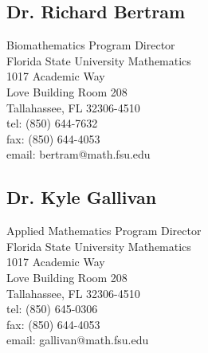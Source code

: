 \documentclass[11pt]{cv}
\begin{document}
\subsection*{Dr. Richard Bertram}
\label{sec:orgff525f8}
Biomathematics Program Director\\
Florida State University Mathematics\\
1017 Academic Way\\
Love Building Room 208\\
Tallahassee, FL 32306-4510\\
tel: (850) 644-7632\\
fax: (850) 644-4053\\
email: bertram@math.fsu.edu\\
\subsection*{Dr. Kyle Gallivan}
\label{sec:org282be8c}
Applied Mathematics Program Director\\
Florida State University Mathematics\\
1017 Academic Way\\
Love Building Room 208\\
Tallahassee, FL 32306-4510\\
tel: (850) 645-0306\\
fax: (850) 644-4053\\
email: gallivan@math.fsu.edu\\
\end{document}
